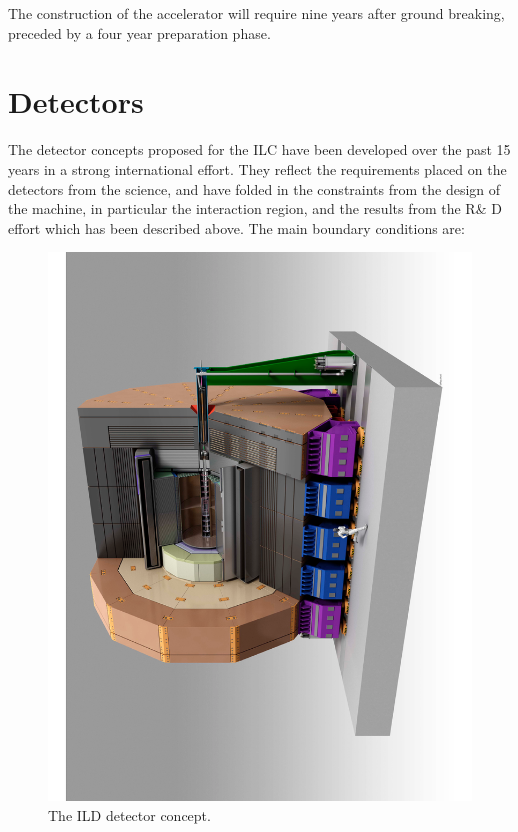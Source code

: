 \documentclass[%
 reprint,
 amsmath,amssymb,
 aps,
]{revtex4-1}
\newcommand{\todo}[1]{\textcolor{red}{{#1}}}
\begin{document}
The construction of the accelerator will require nine years after ground breaking, preceded by a four year preparation phase.




\section{\label{sec:detect} Detectors}



The detector concepts proposed for the ILC have been developed over the past 15 years in a strong international effort. They reflect the requirements placed on the detectors from the science, and have folded in the constraints from the design of the machine, in particular the interaction region, and the results from the R\& D effort which has been described above.  
The main boundary conditions are: 
\begin{figure}[tb]
 \begin{center}
 \includegraphics[width=0.7\hsize,angle=-90]{figures/ILD.pdf}
\caption{The ILD detector concept.
\label{fig_ild}}
 \end{center}
 \end{figure}
 
\end{document}
